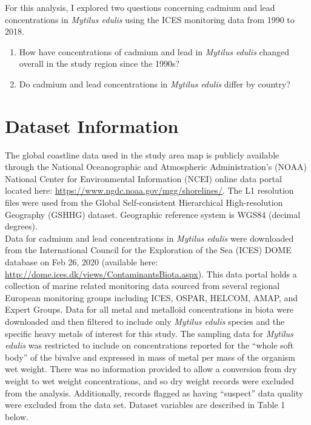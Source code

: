 \documentclass[
  12pt,
]{article}
\providecommand{\tightlist}{%
  \setlength{\itemsep}{0pt}\setlength{\parskip}{0pt}}
\begin{document}
For this analysis, I explored two questions concerning cadmium and lead
concentrations in \emph{Mytilus edulis} using the ICES monitoring data
from 1990 to 2018.

\begin{enumerate}
\def\labelenumi{\arabic{enumi}.}
\tightlist
\item
  How have concentrations of cadmium and lead in \emph{Mytilus edulis}
  changed overall in the study region since the 1990s?
\item
  Do cadmium and lead concentrations in \emph{Mytilus edulis} differ by
  country?
\end{enumerate}

\newpage

\hypertarget{dataset-information}{%
\section{Dataset Information}\label{dataset-information}}

The global coastline data used in the study area map is publicly
available through the National Oceanographic and Atmospheric
Administration's (NOAA) National Center for Environmental Information
(NCEI) online data portal located here:
\url{https://www.ngdc.noaa.gov/mgg/shorelines/}. The L1 resolution files
were used from the Global Self-consistent Hierarchical High-resolution
Geography (GSHHG) dataset. Geographic reference system is WGS84 (decimal
degrees).\\
Data for cadmium and lead concentrations in \emph{Mytilus edulis} were
downloaded from the International Council for the Exploration of the Sea
(ICES) DOME database on Feb 26, 2020 (available here:
\url{http://dome.ices.dk/views/ContaminantsBiota.aspx}). This data
portal holds a collection of marine related monitoring data sourced from
several regional European monitoring groups including ICES, OSPAR,
HELCOM, AMAP, and Expert Groups. Data for all metal and metalloid
concentrations in biota were downloaded and then filtered to include
only \emph{Mytilus edulis} species and the specific heavy metals of
interest for this study. The sampling data for \emph{Mytilus edulis} was
restricted to include on concentrations reported for the ``whole soft
body'' of the bivalve and expressed in mass of metal per mass of the
organism wet weight. There was no information provided to allow a
conversion from dry weight to wet weight concentrations, and so dry
weight records were excluded from the analysis. Additionally, records
flagged as having ``suspect'' data quality were excluded from the data
set. Dataset variables are described in Table 1 below.
\end{document}
